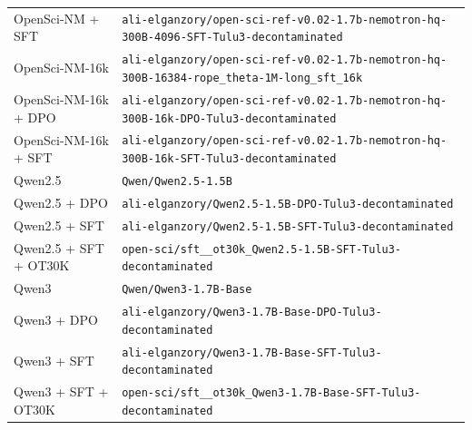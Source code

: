 \begin{table}[ht]
\begin{tabular}{lp{10cm}}
OpenSci-NM + SFT & \texttt{ali-\allowbreak{}elganzory/\allowbreak{}open-\allowbreak{}sci-\allowbreak{}ref-\allowbreak{}v0.02-\allowbreak{}1.7b-\allowbreak{}nemotron-\allowbreak{}hq-\allowbreak{}300B-\allowbreak{}4096-\allowbreak{}SFT-\allowbreak{}Tulu3-\allowbreak{}decontaminated} \\
OpenSci-NM-16k & \texttt{ali-\allowbreak{}elganzory/\allowbreak{}open-\allowbreak{}sci-\allowbreak{}ref-\allowbreak{}v0.02-\allowbreak{}1.7b-\allowbreak{}nemotron-\allowbreak{}hq-\allowbreak{}300B-\allowbreak{}16384-\allowbreak{}rope\_theta-\allowbreak{}1M-\allowbreak{}long\_sft\_16k} \\
OpenSci-NM-16k + DPO & \texttt{ali-\allowbreak{}elganzory/\allowbreak{}open-\allowbreak{}sci-\allowbreak{}ref-\allowbreak{}v0.02-\allowbreak{}1.7b-\allowbreak{}nemotron-\allowbreak{}hq-\allowbreak{}300B-\allowbreak{}16k-\allowbreak{}DPO-\allowbreak{}Tulu3-\allowbreak{}decontaminated} \\
OpenSci-NM-16k + SFT & \texttt{ali-\allowbreak{}elganzory/\allowbreak{}open-\allowbreak{}sci-\allowbreak{}ref-\allowbreak{}v0.02-\allowbreak{}1.7b-\allowbreak{}nemotron-\allowbreak{}hq-\allowbreak{}300B-\allowbreak{}16k-\allowbreak{}SFT-\allowbreak{}Tulu3-\allowbreak{}decontaminated} \\
Qwen2.5 & \texttt{Qwen/\allowbreak{}Qwen2.5-\allowbreak{}1.5B} \\
Qwen2.5 + DPO & \texttt{ali-\allowbreak{}elganzory/\allowbreak{}Qwen2.5-\allowbreak{}1.5B-\allowbreak{}DPO-\allowbreak{}Tulu3-\allowbreak{}decontaminated} \\
Qwen2.5 + SFT & \texttt{ali-\allowbreak{}elganzory/\allowbreak{}Qwen2.5-\allowbreak{}1.5B-\allowbreak{}SFT-\allowbreak{}Tulu3-\allowbreak{}decontaminated} \\
Qwen2.5 + SFT + OT30K & \texttt{open-\allowbreak{}sci/\allowbreak{}sft\_\_ot30k\_Qwen2.5-\allowbreak{}1.5B-\allowbreak{}SFT-\allowbreak{}Tulu3-\allowbreak{}decontaminated} \\
Qwen3 & \texttt{Qwen/\allowbreak{}Qwen3-\allowbreak{}1.7B-\allowbreak{}Base} \\
Qwen3 + DPO & \texttt{ali-\allowbreak{}elganzory/\allowbreak{}Qwen3-\allowbreak{}1.7B-\allowbreak{}Base-\allowbreak{}DPO-\allowbreak{}Tulu3-\allowbreak{}decontaminated} \\
Qwen3 + SFT & \texttt{ali-\allowbreak{}elganzory/\allowbreak{}Qwen3-\allowbreak{}1.7B-\allowbreak{}Base-\allowbreak{}SFT-\allowbreak{}Tulu3-\allowbreak{}decontaminated} \\
Qwen3 + SFT + OT30K & \texttt{open-\allowbreak{}sci/\allowbreak{}sft\_\_ot30k\_Qwen3-\allowbreak{}1.7B-\allowbreak{}Base-\allowbreak{}SFT-\allowbreak{}Tulu3-\allowbreak{}decontaminated} \\

\end{tabular}
\end{table}
